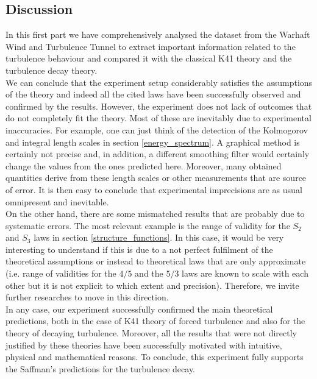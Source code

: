 \documentclass[11pt,titlepage]{article}
\begin{document}
\subsection{Discussion} %
In this first part we have comprehensively analysed the dataset from the Warhaft Wind and Turbulence Tunnel to extract important information related to the turbulence behaviour and compared it with the classical K41 theory and the turbulence decay theory. \\
We can conclude that the experiment setup considerably satisfies the assumptions of the theory and indeed all the cited laws have been successfully observed and confirmed by the results. However, the experiment does not lack of outcomes that do not completely fit the theory. Most of these are inevitably due to experimental inaccuracies. For example, one can just think of the detection of the Kolmogorov and integral length scales in section \ref{energy_spectrum}. A graphical method is certainly not precise and, in addition, a different smoothing filter would certainly change the values from the ones predicted here. Moreover, many obtained quantities derive from these length scales or other measurements that are source of error. It is then easy to conclude that experimental imprecisions are as usual omnipresent and inevitable. \\
On the other hand, there are some mismatched results that are probably due to systematic errors. The most relevant example is the range of validity for the $S_2$ and $S_3$ laws in section \ref{structure_functions}. In this case, it would be very interesting to understand if this is due to a not perfect fulfilment of the theoretical assumptions or instead to theoretical laws that are only approximate (i.e. range of validities for the $4/5$ and the $5/3$ laws are known to scale with each other but it is not explicit to which extent and precision). Therefore, we invite further researches to move in this direction. \\
In any case, our experiment successfully confirmed the main theoretical predictions, both in the case of K41 theory of forced turbulence and also for the theory of decaying turbulence. Moreover, all the results that were not directly justified by these theories have been successfully motivated with intuitive, physical and mathematical reasons. To conclude, this experiment fully supports the Saffman's predictions for the turbulence decay.

\newpage
\end{document}
